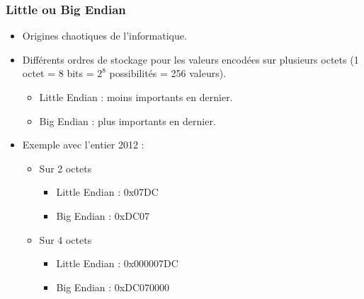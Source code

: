 \frame
{
	\frametitle{Little ou Big Endian}
	\begin{itemize}
		\item<2-> Origines chaotiques de l'informatique.
		\item<3-> Diff\'erents ordres de stockage pour les valeurs encod\'ees sur plusieurs octets (1 octet = 8 bits = $2^8$ possibilit\'es = 256 valeurs).
		\begin{itemize}
			\item<4-> Little Endian : moins importants en dernier.
			\item<5-> Big Endian : plus importants en dernier.
		\end{itemize}
		\item<6-> Exemple avec l'entier 2012 :
		\begin{itemize}
			\item<7-> Sur 2 octets
			\begin{itemize}
				\item<8-> Little Endian : 0x07DC
				\item<9-> Big Endian : 0xDC07
			\end{itemize}
			\item<10-> Sur 4 octets
			\begin{itemize}
				\item<11-> Little Endian : 0x000007DC
				\item<12-> Big Endian : 0xDC070000
			\end{itemize}
		\end{itemize}
	\end{itemize}
}
